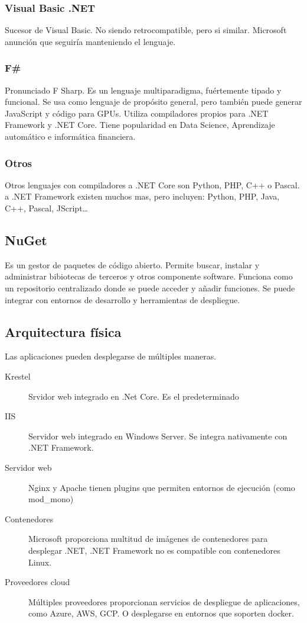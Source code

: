     \subsubsection{Visual Basic .NET}
        Sucesor de Visual Basic. No siendo retrocompatible, pero si similar. Microsoft anunción que seguiría manteniendo el lenguaje.

    \subsubsection{F\#}
        Pronunciado F Sharp. Es un lenguaje multiparadigma, fuértemente tipado y funcional. Se usa como lenguaje de propósito general, pero también puede generar JavaScript y código para GPUs. Utiliza compiladores propios para .NET Framework y .NET Core. Tiene popularidad en Data Science, Aprendizaje automático e informática financiera.
    
    \subsubsection{Otros}
        Otros lenguajes con compiladores a .NET Core son Python, PHP, C++ o Pascal. a .NET Framework existen muchos mas, pero incluyen: Python, PHP, Java, C++, Pascal, JScript\dots

\subsection{NuGet}
    Es un gestor de paquetes de código abierto. Permite buscar, instalar y administrar bibiotecas de terceros y otros componente software. Funciona como un repositorio centralizado donde se puede acceder y añadir funciones. Se puede integrar con entornos de desarrollo y herramientas de despliegue.

\subsection{Arquitectura física}
    Las aplicaciones pueden desplegarse de múltiples maneras.

    \begin{description}
        \item[Krestel] Srvidor web integrado en .Net Core. Es el predeterminado
        \item[IIS] Servidor web integrado en Windows Server. Se integra nativamente con .NET Framework.
        \item[Servidor web] Nginx y Apache tienen plugins que permiten entornos de ejecución (como mod\_mono)
        \item[Contenedores] Microsoft proporciona multitud de imágenes de contenedores para desplegar .NET, .NET Framework no es compatible con contenedores Linux.
        \item[Proveedores cloud] Múltiples proveedores proporcionan servicios de despliegue de aplicaciones, como Azure, AWS, GCP. O desplegarse en entornos que soporten docker.
    \end{description}

